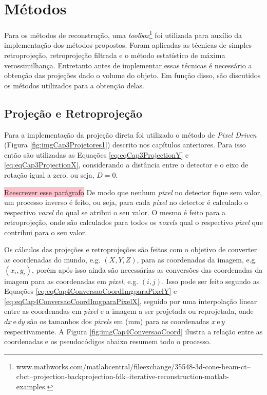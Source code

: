 \section{Métodos} 

Para os métodos de reconstrução, uma \textit{toolbox}\footnote{www.mathworks.com/matlabcentral/fileexchange/35548-3d-cone-beam-ct--cbct--projection-backprojection-fdk--iterative-reconstruction-matlab-examples.} foi utilizada para auxílio da implementação dos métodos propostos. Foram aplicadas as técnicas de simples retroprojeção, retroprojeção filtrada e o método estatístico de máxima verossimilhança. Entretanto antes de implementar essas técnicas é necessário a obtenção das projeções dado o volume do objeto. Em função disso, são discutidos os métodos utilizados para a obtenção delas.  

\subsection{Projeção e Retroprojeção} 

Para a implementação da projeção direta foi utilizado o método de \textit{Pixel Driven} (Figura \ref{fig:imgCap3Projetores1}) descrito nos capítulos anteriores. Para isso então são utilizadas as Equações \ref{eq:eqCap3ProjectionY} e \ref{eq:eqCap3ProjectionX}, considerando a distância entre o detector e o eixo de rotação igual a zero, ou seja, $D=0$. 

 \colorbox{pink}{Reescrever esse parágrafo} De modo que nenhum \textit{pixel} no detector fique sem valor, um processo inverso é feito, ou seja, para cada \textit{pixel} no detector é calculado o respectivo \textit{voxel} do qual se atribui o seu valor. O mesmo é feito para a retroprojeção, onde são calculados para todos os \textit{voxels} qual o respectivo \textit{pixel} que contribui para o seu valor. 


 Os cálculos das projeções e retroprojeções são feitos com o objetivo de converter as coordenadas do mundo, e.g. $(X,Y,Z)$, para as coordenadas da imagem, e.g. $(x_{i},y_{i})$, porém após isso ainda são necessárias as conversões das coordenadas da imagem para as coordenadas em \textit{pixel}, e.g. $(i,j)$. Isso pode ser feito segundo as Equações \ref{eq:eqCap4ConversaoCoordImgparaPixelY} e \ref{eq:eqCap4ConversaoCoordImgparaPixelX}, seguido por uma interpolação linear entre as coordenadas em \textit{pixel} e a imagem a ser projetada ou reprojetada, onde $dx\,\text{e}\,dy$ são os tamanhos dos \textit{pixels} em (mm) para as coordenadas $x\,\text{e}\,y$ respectivamente. A Figura \ref{fig:imgCap4ConversaoCoord} ilustra a relação entre as coordenadas e os pseudocódigos abaixo resumem todo o processo. 
 
